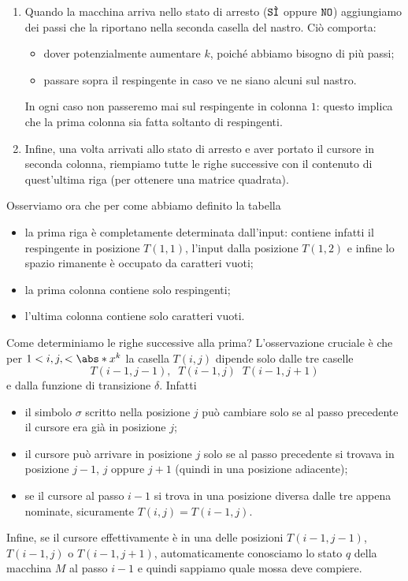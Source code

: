 \begin{enumerate}
  \item Quando la macchina arriva nello stato di arresto ($\SI$ oppure $\NO$)
    aggiungiamo dei passi che la riportano nella seconda casella del nastro.
    Ciò comporta: \begin{itemize}
      \item dover potenzialmente aumentare $k$, poiché abbiamo bisogno di più passi;
      \item passare sopra il respingente in caso ve ne siano alcuni sul nastro.
    \end{itemize} In ogni caso non passeremo mai sul respingente in colonna $1$:
    questo implica che la prima colonna sia fatta soltanto di respingenti.
  \item Infine, una volta arrivati allo stato di arresto e aver portato il cursore
    in seconda colonna, riempiamo tutte le righe successive con il contenuto 
    di quest'ultima riga (per ottenere una matrice quadrata).
\end{enumerate}

Osserviamo ora che per come abbiamo definito la tabella \begin{itemize}
  \item la prima riga è completamente determinata dall'input: contiene infatti
    il respingente in posizione $T(1, 1)$, l'input dalla posizione $T(1, 2)$ e
    infine lo spazio rimanente è occupato da caratteri vuoti;  
  \item la prima colonna contiene solo respingenti;
  \item l'ultima colonna contiene solo caratteri vuoti.
\end{itemize}

Come determiniamo le righe successive alla prima? L'osservazione cruciale è che
per $1 < i, j, < \abs*{x}^k$ la casella $T(i, j)$ dipende solo dalle tre caselle
\[
    T(i-1, j-1), \;\; T(i-1, j) \;\; T(i-1, j+1)
\] e dalla funzione di transizione $\delta$. Infatti \begin{itemize}
  \item il simbolo $\sigma$ scritto nella posizione $j$ può cambiare solo se
    al passo precedente il cursore era già in posizione $j$;
  \item il cursore può arrivare in posizione $j$ solo se al passo precedente
    si trovava in posizione $j-1$, $j$ oppure $j+1$ (quindi in una posizione
    adiacente);
  \item se il cursore al passo $i-1$ si trova in una posizione diversa dalle tre
    appena nominate, sicuramente $T(i, j) = T(i-1, j)$.      
\end{itemize} Infine, se il cursore effettivamente è in una delle posizioni
$T(i-1, j-1)$, $T(i-1, j)$ o $T(i-1, j+1)$, automaticamente conosciamo lo stato
$q$ della macchina $M$ al passo $i-1$ e quindi sappiamo quale mossa deve compiere.

